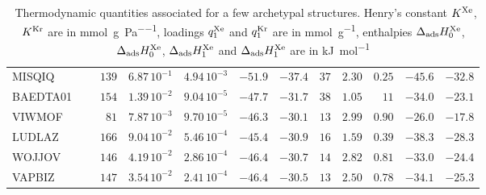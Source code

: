 \documentclass[main.tex]{subfiles}
\begin{document}
\begin{table}[hb]
\begin{tabular}{|lr|rrrrr|rrrrr|}
        MISQIQ &~\cite{MISQIQ}        &  $139$  &  $6.87\,10^{-1}$  &  $4.94\,10^{-3}$  &  $-51.9$  &  $-37.4$  &  $ 37$  &  $2.30$  &  $0.25$  &  $-45.6$  &  $-32.8$  \\
      BAEDTA01 &~\cite{BAEDTA01}      &  $154$  &  $1.39\,10^{-2}$  &  $9.04\,10^{-5}$  &  $-47.7$  &  $-31.7$  &  $ 38$  &  $1.05$  &  $  11$  &  $-34.0$  &  $-23.1$  \\
        VIWMOF &~\cite{VIWMOF}        &  $ 81$  &  $7.87\,10^{-3}$  &  $9.70\,10^{-5}$  &  $-46.3$  &  $-30.1$  &  $ 13$  &  $2.99$  &  $0.90$  &  $-26.0$  &  $-17.8$  \\
        LUDLAZ &~\cite{LUDLAZ}        &  $166$  &  $9.04\,10^{-2}$  &  $5.46\,10^{-4}$  &  $-45.4$  &  $-30.9$  &  $ 16$  &  $1.59$  &  $0.39$  &  $-38.3$  &  $-28.3$  \\
        WOJJOV &~\cite{WOJJOV}        &  $146$  &  $4.19\,10^{-2}$  &  $2.86\,10^{-4}$  &  $-46.4$  &  $-30.7$  &  $ 14$  &  $2.82$  &  $0.81$  &  $-33.0$  &  $-24.4$  \\
        VAPBIZ &~\cite{VAPBIZ}        &  $147$  &  $3.54\,10^{-2}$  &  $2.41\,10^{-4}$  &  $-46.4$  &  $-30.5$  &  $ 13$  &  $2.50$  &  $0.78$  &  $-34.1$  &  $-25.3$  \\
    \hline
    \end{tabular}
    \caption{\ Thermodynamic quantities associated for a few archetypal structures. Henry's constant $K^{\text{Xe}}$, $K^{\text{Kr}}$ are in \si{\milli\mol\per\gram\per\pascal}, loadings $q^{\text{Xe}}_{\text{1}}$ and $q^{\text{Kr}}_{\text{1}}$ are in \si{\milli\mol\per\gram}, enthalpies $\Delta_{\text{ads}}H^{\text{Xe}}_{\text{0}}$, $\Delta_{\text{ads}}H^{\text{Xe}}_{\text{0}}$, $\Delta_{\text{ads}}H^{\text{Xe}}_{\text{1}}$ and $\Delta_{\text{ads}}H^{\text{Xe}}_{\text{1}}$ are in \si{\kilo\joule\per\mol}}\label{tbl:thermo}
\end{table}
\end{document}
